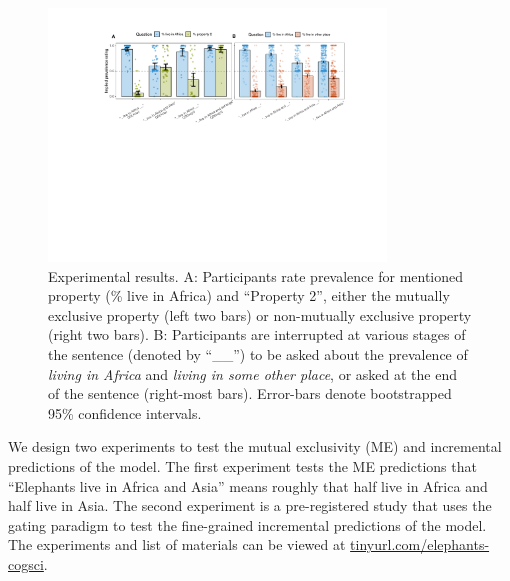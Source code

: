 \documentclass[letterpaper, 12pt]{article}
\begin{document}
\begin{figure}[t]
  \begin{center}
    \includegraphics[width=0.8\textwidth]{xprag}
  \end{center}
  \vspace{-0.55cm}
  \caption{\small Experimental results. A: Participants rate prevalence for mentioned property (\% live in Africa) and ``Property 2'', either the mutually exclusive property (left two bars) or non-mutually exclusive property (right two bars).  B: Participants are interrupted at various stages of the sentence (denoted by ``\_\_'') to be asked about the prevalence of \emph{living in Africa} and \emph{living in some other place}, or asked at the end of the sentence (right-most bars). Error-bars denote bootstrapped 95\% confidence intervals.}
  \label{fig:results}
    \vspace{-0.55cm}
\end{figure}

We design two experiments to test the mutual exclusivity (ME) and incremental predictions of the model. 
The first experiment tests the ME predictions that ``Elephants live in Africa and Asia'' means roughly that half live in Africa and half live in Asia.%
The second experiment is a pre-registered study that uses the gating paradigm to test the fine-grained incremental predictions of the model.
The experiments and list of materials can be viewed at \url{tinyurl.com/elephants-cogsci}.

\end{document}
